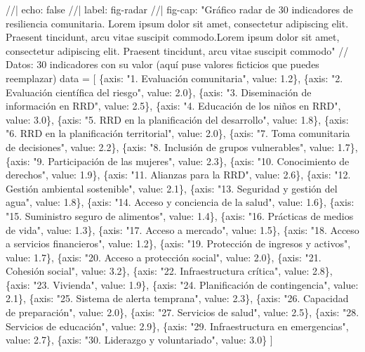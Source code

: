 \documentclass[
  spanish,
  letterpaper,
]{book}
\newenvironment{Shaded}{\begin{snugshade}}{\end{snugshade}}
\newcommand{\NormalTok}[1]{\textcolor[rgb]{0.00,0.23,0.31}{#1}}
\begin{document}
\begin{Shaded}
\begin{Highlighting}[]
\NormalTok{//| echo: false}
\NormalTok{//| label: fig{-}radar}
\NormalTok{//| fig{-}cap: "Gráfico radar de 30 indicadores de resiliencia comunitaria. Lorem ipsum dolor sit amet, consectetur adipiscing elit. Praesent tincidunt, arcu vitae suscipit commodo.Lorem ipsum dolor sit amet, consectetur adipiscing elit. Praesent tincidunt, arcu vitae suscipit commodo"}
\NormalTok{// Datos: 30 indicadores con su valor (aquí puse valores ficticios que puedes reemplazar)}
\NormalTok{data = [}
\NormalTok{  \{axis: "1. Evaluación comunitaria", value: 1.2\},}
\NormalTok{  \{axis: "2. Evaluación científica del riesgo", value: 2.0\},}
\NormalTok{  \{axis: "3. Diseminación de información en RRD", value: 2.5\},}
\NormalTok{  \{axis: "4. Educación de los niños en RRD", value: 3.0\},}
\NormalTok{  \{axis: "5. RRD en la planificación del desarrollo", value: 1.8\},}
\NormalTok{  \{axis: "6. RRD en la planificación territorial", value: 2.0\},}
\NormalTok{  \{axis: "7. Toma comunitaria de decisiones", value: 2.2\},}
\NormalTok{  \{axis: "8. Inclusión de grupos vulnerables", value: 1.7\},}
\NormalTok{  \{axis: "9. Participación de las mujeres", value: 2.3\},}
\NormalTok{  \{axis: "10. Conocimiento de derechos", value: 1.9\},}
\NormalTok{  \{axis: "11. Alianzas para la RRD", value: 2.6\},}
\NormalTok{  \{axis: "12. Gestión ambiental sostenible", value: 2.1\},}
\NormalTok{  \{axis: "13. Seguridad y gestión del agua", value: 1.8\},}
\NormalTok{  \{axis: "14. Acceso y conciencia de la salud", value: 1.6\},}
\NormalTok{  \{axis: "15. Suministro seguro de alimentos", value: 1.4\},}
\NormalTok{  \{axis: "16. Prácticas de medios de vida", value: 1.3\},}
\NormalTok{  \{axis: "17. Acceso a mercado", value: 1.5\},}
\NormalTok{  \{axis: "18. Acceso a servicios financieros", value: 1.2\},}
\NormalTok{  \{axis: "19. Protección de ingresos y activos", value: 1.7\},}
\NormalTok{  \{axis: "20. Acceso a protección social", value: 2.0\},}
\NormalTok{  \{axis: "21. Cohesión social", value: 3.2\},}
\NormalTok{  \{axis: "22. Infraestructura crítica", value: 2.8\},}
\NormalTok{  \{axis: "23. Vivienda", value: 1.9\},}
\NormalTok{  \{axis: "24. Planificación de contingencia", value: 2.1\},}
\NormalTok{  \{axis: "25. Sistema de alerta temprana", value: 2.3\},}
\NormalTok{  \{axis: "26. Capacidad de preparación", value: 2.0\},}
\NormalTok{  \{axis: "27. Servicios de salud", value: 2.5\},}
\NormalTok{  \{axis: "28. Servicios de educación", value: 2.9\},}
\NormalTok{  \{axis: "29. Infraestructura en emergencias", value: 2.7\},}
\NormalTok{  \{axis: "30. Liderazgo y voluntariado", value: 3.0\}}
\NormalTok{]}


\end{Highlighting}
\end{Shaded}
\end{document}
